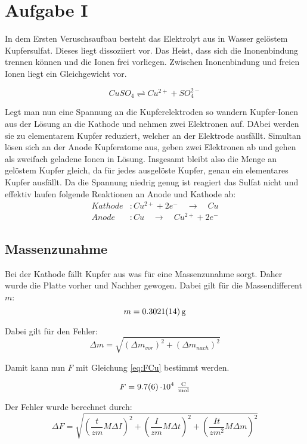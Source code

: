 \section{Aufgabe I}
In dem Ersten Veruschsaufbau besteht das Elektrolyt aus in Wasser gelöstem Kupfersulfat. Dieses liegt dissoziiert vor.
Das Heist, dass sich die Inonenbindung trennen können und die Ionen frei vorliegen. Zwischen Inonenbindung und freien Ionen liegt ein Gleichgewicht vor.

\[CuSO_4 \rightleftharpoons Cu ^{2+} + SO_4^{2-}\]

Legt man nun eine Spannung an die Kupferelektroden so wandern Kupfer-Ionen aus der Lösung an die Kathode und nehmen zwei Elektronen auf. DAbei werden sie zu elementarem Kupfer reduziert,
welcher an der Elektrode ausfällt. Simultan lösen sich an der Anode Kupferatome aus, geben zwei Elektronen ab und gehen als zweifach geladene Ionen in Lösung.
Insgesamt bleibt also die Menge an gelöstem Kupfer gleich, da für jedes ausgelöste Kupfer, genau ein elementares Kupfer ausfällt.
Da die Spannung niedrig genug ist reagiert das Sulfat nicht und effektiv laufen folgende Reaktionen an Anode und Kathode ab:
\begin{align}
    Kathode&:Cu^{2+} + 2e^- \quad\rightarrow  \quad Cu\\
    Anode &: Cu \quad\rightarrow  \quad Cu^{2+} + 2e^-
\end{align}

\subsection{Massenzunahme}

Bei der Kathode fällt Kupfer aus was für eine Massenzunahme sorgt. Daher wurde die Platte vorher und Nachher gewogen. Dabei gilt für die Massendifferent $m$:
\[ m= \SI{0,3021 \pm 0,0014}{\gram}\]

Dabei gilt für den Fehler:
\begin{equation}
    \Delta m = \sqrt{(\Delta m_{vor})^2 + (\Delta m_{nach})^2}
\end{equation}

Damit kann nun $F$ mit Gleichung \ref{eq:FCu} bestimmt werden.

\[F = \SI{9,7\pm 0,6}{\cdot 10^{4}\ \tfrac{\coulomb}{\mole}}\]

Der Fehler wurde berechnet durch:
\begin{equation}
    \Delta F = \sqrt{\left(\frac{t}{zm} M \Delta I\right)^2 + \left(\frac{I}{zm} M \Delta t\right)^2 + \left(\frac{It }{z m^2} M\Delta m\right)^2}
\end{equation}


